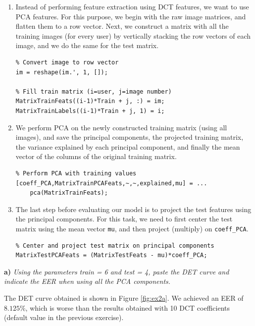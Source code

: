 \documentclass[11pt]{article}
\begin{document}
\begin{enumerate}
  \item Instead of performing feature extraction using DCT features, we want to use PCA features. For this purpose, we begin with the raw image matrices, and flatten them to a row vector. Next, we construct a matrix with all the training images (for every user) by vertically stacking the row vectors of each image, and we do the same for the test matrix.
  \begin{verbatim}
% Convert image to row vector
im = reshape(im.', 1, []);

% Fill train matrix (i=user, j=image number)
MatrixTrainFeats((i-1)*Train + j, :) = im;
MatrixTrainLabels((i-1)*Train + j, 1) = i;
  \end{verbatim}
  \item We perform PCA on the newly constructed training matrix (using all images), and save the principal components, the projected training matrix, the variance explained by each principal component, and finally the mean vector of the columns of the original training matrix.
  \begin{verbatim}
% Perform PCA with training values
[coeff_PCA,MatrixTrainPCAFeats,~,~,explained,mu] = ...
    pca(MatrixTrainFeats);
  \end{verbatim}
\item The last step before evaluating our model is to project the test features using the principal components. For this task, we need to first center the test matrix using the mean vector \verb|mu|, and then project (multiply) on \verb|coeff_PCA|.
\begin{verbatim}
% Center and project test matrix on principal components
MatrixTestPCAFeats = (MatrixTestFeats - mu)*coeff_PCA;
\end{verbatim}
\end{enumerate}

\textbf{a)} \emph{Using the parameters train = 6 and test = 4, paste the DET curve and indicate the EER when using all the PCA components.}

The DET curve obtained is shown in Figure \ref{fig:ex2a}. We achieved an EER of $8.125\%$, which is worse than the results obtained with 10 DCT coefficients (default value in the previous exercise).
\end{document}
